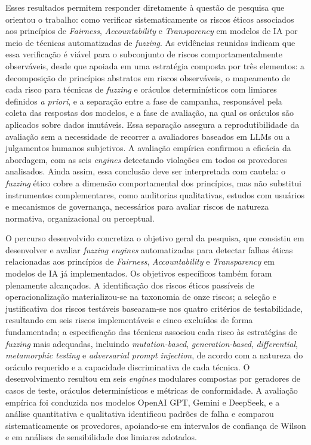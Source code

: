 Esses resultados permitem responder diretamente à questão de pesquisa que orientou o trabalho: como verificar sistematicamente os riscos éticos associados aos princípios de \textit{Fairness}, \textit{Accountability} e \textit{Transparency} em modelos de IA por meio de técnicas automatizadas de \textit{fuzzing}. As evidências reunidas indicam que essa verificação é viável para o subconjunto de riscos comportamentalmente observáveis, desde que apoiada em uma estratégia composta por três elementos: a decomposição de princípios abstratos em riscos observáveis, o mapeamento de cada risco para técnicas de \textit{fuzzing} e oráculos determinísticos com limiares definidos \textit{a priori}, e a separação entre a fase de campanha, responsável pela coleta das respostas dos modelos, e a fase de avaliação, na qual os oráculos são aplicados sobre dados imutáveis. Essa separação assegura a reprodutibilidade da avaliação sem a necessidade de recorrer a avaliadores baseados em LLMs ou a julgamentos humanos subjetivos. A avaliação empírica confirmou a eficácia da abordagem, com as seis \textit{engines} detectando violações em todos os provedores analisados. Ainda assim, essa conclusão deve ser interpretada com cautela: o \textit{fuzzing} ético cobre a dimensão comportamental dos princípios, mas não substitui instrumentos complementares, como auditorias qualitativas, estudos com usuários e mecanismos de governança, necessários para avaliar riscos de natureza normativa, organizacional ou perceptual.

O percurso desenvolvido concretiza o objetivo geral da pesquisa, que consistiu em desenvolver e avaliar \textit{fuzzing engines} automatizadas para detectar falhas éticas relacionadas aos princípios de \textit{Fairness}, \textit{Accountability} e \textit{Transparency} em modelos de IA já implementados. Os objetivos específicos também foram plenamente alcançados. A identificação dos riscos éticos passíveis de operacionalização materializou-se na taxonomia de onze riscos; a seleção e justificativa dos riscos testáveis basearam-se nos quatro critérios de testabilidade, resultando em seis riscos implementáveis e cinco excluídos de forma fundamentada; a especificação das técnicas associou cada risco às estratégias de \textit{fuzzing} mais adequadas, incluindo \textit{mutation-based}, \textit{generation-based}, \textit{differential}, \textit{metamorphic testing} e \textit{adversarial prompt injection}, de acordo com a natureza do oráculo requerido e a capacidade discriminativa de cada técnica. O desenvolvimento resultou em seis \textit{engines} modulares compostas por geradores de casos de teste, oráculos determinísticos e métricas de conformidade. A avaliação empírica foi conduzida nos modelos OpenAI GPT, Gemini e DeepSeek, e a análise quantitativa e qualitativa identificou padrões de falha e comparou sistematicamente os provedores, apoiando-se em intervalos de confiança de Wilson e em análises de sensibilidade dos limiares adotados.

